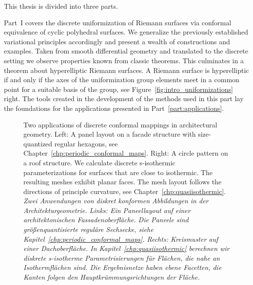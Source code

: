 \documentclass[Thesis.tex]{subfiles}
\begin{document}
This thesis is divided into three parts. 

Part~I covers the discrete uniformization of Riemann surfaces via conformal equivalence of cyclic polyhedral surfaces.
We generalize the previously established variational principles accordingly and present a wealth of constructions and examples. 
Taken from smooth differential geometry and translated to the discrete setting we observe properties known from classic theorems. 
This culminates in a theorem about hyperelliptic Riemann surfaces.
A Riemann surface is hyperelliptic if and only if the axes of the uniformization group elements meet in a common point for a suitable basis of the group, see Figure~\ref{fig:intro_uniformizations} right.
The tools created in the development of the methods used in this part lay the foundations for the applications presented in Part~\ref{part:applications}.

\begin{figure}
\centering
{}
\caption{
Two applications of discrete conformal mappings in architectural geometry. 
Left: A panel layout on a facade structure with size-quantized regular hexagons, see Chapter~\ref{chp:periodic_conformal_maps}.
Right: A circle pattern on a roof structure. 
We calculate discrete s-isothermic parameterizations for surfaces that are close to isothermic.
The resulting meshes exhibit planar faces. 
The mesh layout follows the directions of principle curvature, see Chapter~\ref{chp:quasiisothermic}.\\
\it Zwei Anwendungen von diskret konformen Abbildungen in der Architekturgeometrie. 
Links: Ein Paneellayout auf einer architektonischen Fassadenoberfl\"{a}che. 
Die Paneele sind gr\"{o}{\ss}enquantisierte regul\"{a}re Sechsecke, siehe Kapitel~\ref{chp:periodic_conformal_maps}.
Rechts: Kreismuster auf einer Dachoberfl\"{a}che.
In Kapitel~\ref{chp:quasiisothermic} berechnen wir diskrete s-isotherme Parametrisierungen f\"{u}r Fl\"{a}chen, die nahe an Isothermfl\"{a}chen sind.
Die Ergebnisnetze haben ebene Facetten, die Kanten folgen den Hauptkr\"{u}mmungsrichtungen der Fl\"{a}che. 
}
\label{fig:intro_applications} 
\end{figure}
\end{document}
